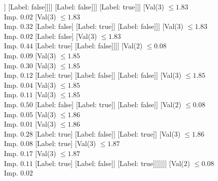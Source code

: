 \documentclass[margin=10pt]{standalone}
\begin{document}
\begin{forest}
														[Val($3$) $ \leq 1.80$ \\ Imp. $0.11$
															[Label: false]
															[Val($3$) $ \leq 1.82$ \\ Imp. $0.22$
																[Label: true]
																[Val($3$) $ \leq 1.83$ \\ Imp. $0.11$
																	[Val($3$) $ \leq 1.82$ \\ Imp. $0.50$
																		[Label: false]
																		[Label: true]]
																	[Label: false]]]]
														[Label: false]]]
												[Label: true]]]
										[Val($3$) $ \leq 1.83$ \\ Imp. $0.02$
											[Val($3$) $ \leq 1.83$ \\ Imp. $0.32$
												[Label: false]
												[Label: true]]
											[Label: false]]]
									[Val($3$) $ \leq 1.83$ \\ Imp. $0.02$
										[Label: false]
										[Val($3$) $ \leq 1.83$ \\ Imp. $0.44$
											[Label: true]
											[Label: false]]]]
								[Val($2$) $ \leq 0.08$ \\ Imp. $0.09$
									[Val($3$) $ \leq 1.85$ \\ Imp. $0.30$
										[Val($3$) $ \leq 1.85$ \\ Imp. $0.12$
											[Label: true]
											[Label: false]]
										[Label: false]]
									[Val($3$) $ \leq 1.85$ \\ Imp. $0.04$
										[Val($3$) $ \leq 1.85$ \\ Imp. $0.11$
											[Val($3$) $ \leq 1.85$ \\ Imp. $0.50$
												[Label: false]
												[Label: true]]
											[Label: false]]
										[Val($2$) $ \leq 0.08$ \\ Imp. $0.05$
											[Val($3$) $ \leq 1.86$ \\ Imp. $0.01$
												[Val($3$) $ \leq 1.86$ \\ Imp. $0.28$
													[Label: true]
													[Label: false]]
												[Label: true]]
											[Val($3$) $ \leq 1.86$ \\ Imp. $0.08$
												[Label: true]
												[Val($3$) $ \leq 1.87$ \\ Imp. $0.17$
													[Val($3$) $ \leq 1.87$ \\ Imp. $0.11$
														[Label: true]
														[Label: false]]
													[Label: true]]]]]]]
							[Val($2$) $ \leq 0.08$ \\ Imp. $0.02$

\end{forest}
\end{document}

